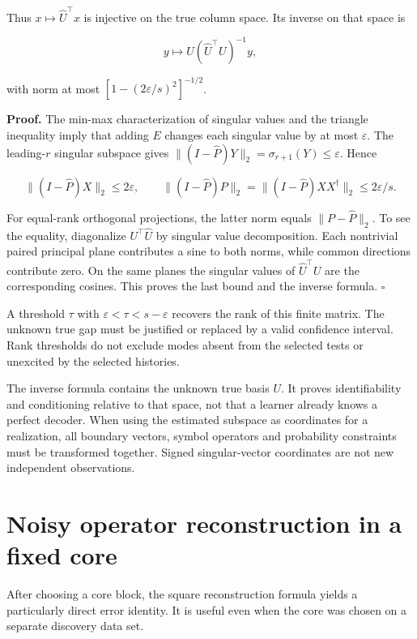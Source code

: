 Thus \(x\mapsto\widehat U^\top x\) is injective on the true column
space. Its inverse on that space is

\[
y\longmapsto U(\widehat U^\top U)^{-1}y,
\]

with norm at most \([1-(2\varepsilon/s)^2]^{-1/2}\).

\textbf{Proof.} The min-max characterization of singular values and the
triangle inequality imply that adding \(E\) changes each singular value
by at most \(\varepsilon\). The leading-\(r\) singular subspace gives
\(\|(I-\widehat P)Y\|_2=\sigma_{r+1}(Y)\leq\varepsilon\). Hence

\[
\|(I-\widehat P)X\|_2\leq2\varepsilon,
\qquad
\|(I-\widehat P)P\|_2
=\|(I-\widehat P)XX^\dagger\|_2\leq2\varepsilon/s.
\]

For equal-rank orthogonal projections, the latter norm equals
\(\|P-\widehat P\|_2\). To see the equality, diagonalize
\(U^\top\widehat U\) by singular value decomposition. Each nontrivial
paired principal plane contributes a sine to both norms, while common
directions contribute zero. On the same planes the singular values of
\(\widehat U^\top U\) are the corresponding cosines. This proves the
last bound and the inverse formula. \(\square\)

A threshold \(\tau\) with \(\varepsilon<\tau<s-\varepsilon\) recovers
the rank of this finite matrix. The unknown true gap must be justified
or replaced by a valid confidence interval. Rank thresholds do not
exclude modes absent from the selected tests or unexcited by the
selected histories.

The inverse formula contains the unknown true basis \(U\). It proves
identifiability and conditioning relative to that space, not that a
learner already knows a perfect decoder. When using the estimated
subspace as coordinates for a realization, all boundary vectors, symbol
operators and probability constraints must be transformed together.
Signed singular-vector coordinates are not new independent observations.

\section{Noisy operator reconstruction in a fixed core}\label{LSM:noisy-operator-reconstruction-in-a-fixed-core}

After choosing a core block, the square reconstruction formula yields a
particularly direct error identity. It is useful even when the core was
chosen on a separate discovery data set.

